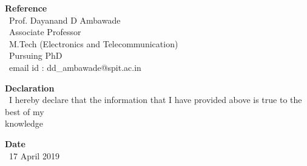 \documentclass[12pt]{article}
\begin{document}
\begin{flushleft}
\vspace{5mm}
\textbf{Reference}\\
\vspace{5mm}
\ Prof. Dayanand D Ambawade\\
\ Associate Professor \\
\ M.Tech (Electronics and Telecommunication)\\
\ Pursuing PhD\\
\ email id : dd\_ambawade@spit.ac.in\\
\vspace{5mm}

\textbf{Declaration} \\
\vspace{5mm}
\ I hereby declare that the information that I have provided above is true to the best of my \\knowledge\\   
\vspace{5mm}

\textbf{Date} \\
\vspace{2mm}
\ 17 April 2019

\end{flushleft}
\end{document}
